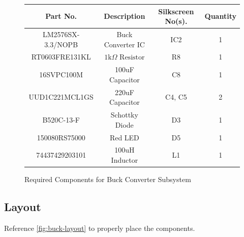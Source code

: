 \documentclass{article}
\newcommand{\resistor}[1]{$\text{#1} \Omega \text{ Resistor}$}
\begin{document}
\begin{figure}[H]
    \begin{center}
        \begin{tabular}{ c|c|c|c } 
            \textbf{Part No.} & \textbf{Description} & \textbf{Silkscreen No(s).} & \textbf{Quantity} \\ 
            \hline
            LM2576SX-3.3/NOPB & Buck Converter IC & IC2 & 1 \\ 
            \hline
            RT0603FRE131KL & \resistor{1k} & R8 & 1 \\ 
            \hline
            16SVPC100M & 100uF Capacitor & C8 & 1 \\ 
            \hline
            UUD1C221MCL1GS & 220uF Capacitor & C4, C5 & 2 \\ 
            \hline
            B520C-13-F & Schottky Diode & D3 & 1 \\ 
            \hline
            150080RS75000 & Red LED & D5 & 1 \\ 
            \hline
            74437429203101 & 100uH Inductor & L1 & 1 \\ 
        \end{tabular}
    \end{center}
    \caption{Required Components for Buck Converter Subsystem}
    \label{tbl:buck-materials}
\end{figure}

\subsection{Layout}

Reference \autoref{fig:buck-layout} to properly place the components.
\end{document}
